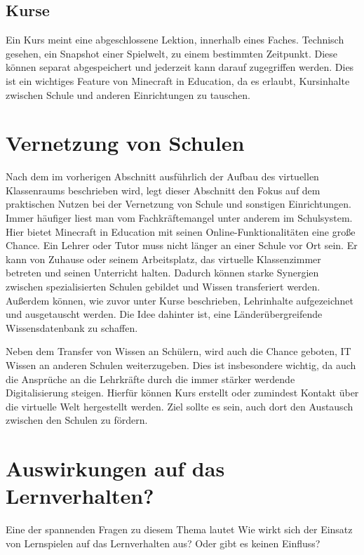 \subsection{Kurse}

Ein Kurs meint eine abgeschlossene Lektion, innerhalb eines Faches. Technisch gesehen, ein Snapshot einer Spielwelt, zu einem bestimmten Zeitpunkt. Diese können separat abgespeichert und jederzeit kann darauf zugegriffen werden. Dies ist ein wichtiges Feature von Minecraft in Education, da es erlaubt, Kursinhalte zwischen Schule und anderen Einrichtungen zu tauschen.

\section{Vernetzung von Schulen}

Nach dem im vorherigen Abschnitt ausführlich der Aufbau des virtuellen Klassenraums beschrieben wird, legt dieser Abschnitt den Fokus auf dem praktischen Nutzen bei der Vernetzung von Schule und sonstigen Einrichtungen.
Immer häufiger liest man vom Fachkräftemangel unter anderem im Schulsystem. Hier bietet Minecraft in Education mit seinen Online-Funktionalitäten eine große Chance. Ein Lehrer oder Tutor muss nicht länger an einer Schule vor Ort sein. Er kann von Zuhause oder seinem Arbeitsplatz, das virtuelle Klassenzimmer betreten und seinen Unterricht halten. Dadurch können starke Synergien zwischen spezialisierten Schulen gebildet und Wissen transferiert werden.
Außerdem können, wie zuvor unter Kurse beschrieben, Lehrinhalte aufgezeichnet und ausgetauscht werden.
Die Idee dahinter ist, eine Länderübergreifende Wissensdatenbank zu schaffen.

Neben dem Transfer von Wissen an Schülern, wird auch die Chance geboten, IT Wissen an anderen Schulen weiterzugeben. Dies ist insbesondere wichtig, da auch die Ansprüche an die Lehrkräfte durch die immer stärker werdende Digitalisierung steigen. Hierfür können Kurs erstellt oder zumindest Kontakt über die virtuelle Welt hergestellt werden. Ziel sollte es sein, auch dort den Austausch zwischen den Schulen zu fördern.

\section{Auswirkungen auf das Lernverhalten?}

Eine der spannenden Fragen zu diesem Thema lautet Wie wirkt sich der Einsatz von Lernspielen auf das Lernverhalten aus? Oder gibt es keinen Einfluss?

